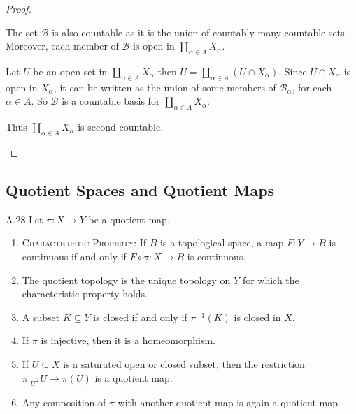 \begin{proof}
\begin{enumerate}[itemsep=0pt,label={(\alph*)}]
              The set \( \mathcal{B} \) is also countable as it is the union of countably many countable sets. Moreover, each member of \( \mathcal{B} \) is open in \( \coprod_{\alpha\in A} X_{\alpha} \).

              Let \( U \) be an open set in \( \coprod_{\alpha\in A} X_{\alpha} \) then \( U = \coprod_{\alpha\in A} (U \cap X_{\alpha}) \). Since \( U \cap X_{\alpha} \) is open in \( X_{\alpha} \), it can be written as the union of some members of \( \mathcal{B}_{\alpha} \), for each \( \alpha \in A \). So \( \mathcal{B} \) is a countable basis for \( \coprod_{\alpha\in A} X_{\alpha} \).

              Thus \( \coprod_{\alpha\in A} X_{\alpha} \) is second-countable.
    \end{enumerate}
\end{proof}

\subsection{Quotient Spaces and Quotient Maps}

\begin{exercise}{A.28}
    Let \(\pi: X \to Y\) be a quotient map.

    \begin{enumerate}[itemsep=0pt,label={(\alph*)}]
        \item \textsc{Characteristic Property:} If \(B\) is a topological space, a map \(F: Y \to B\) is continuous if and only if \(F \circ \pi: X \to B\) is continuous.

        \item The quotient topology is the unique topology on \(Y\) for which the characteristic property holds.

        \item A subset \(K \subseteq Y\) is closed if and only if \(\pi^{-1}(K)\) is closed in \(X\).

        \item If \(\pi\) is injective, then it is a homeomorphism.

        \item If \(U \subseteq X\) is a saturated open or closed subset, then the restriction \(\pi|_{U}: U \to \pi(U)\) is a quotient map.

        \item Any composition of \(\pi\) with another quotient map is again a quotient map.
    \end{enumerate}
\end{exercise}

